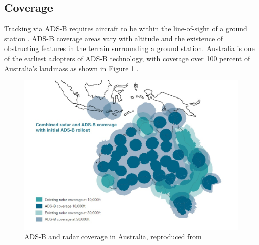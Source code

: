 \subsection{Coverage}
Tracking via ADS-B requires aircraft to be within the line-of-sight of a ground station \cite{ADSB_CASA_booklet}. ADS-B coverage areas vary with altitude and the existence of obstructing features in the terrain surrounding a ground station. Australia is one of the earliest adopters of ADS-B technology, with coverage over 100 percent of Australia's landmass as shown in Figure \ref{fig:adsb_aus_coverage} \cite{ADSB_CASA_booklet}.
\begin{figure}[H]
	\centering
	\includegraphics[scale = 0.5]{Pictures/adsb_coverage.jpg}
	
	\caption[ADS-B and radar coverage in Australia]{ADS-B and radar coverage in Australia, reproduced from \cite{ADSB_CASA_booklet}}
	\label{fig:adsb_aus_coverage}
\end{figure}

